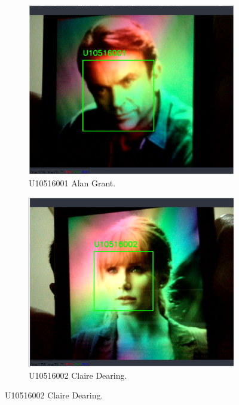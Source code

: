 \documentclass[14pt]{report}
\begin{document}
\begin{figure}[h!]
    \centering
        \begin{subfigure}[b]{0.32\linewidth}
            \includegraphics[width=\linewidth]{exp01.eps}
            \caption{U10516001 Alan Grant.}
        \end{subfigure}
        \begin{subfigure}[b]{0.32\linewidth}
            \includegraphics[width=\linewidth]{exp02.eps}
            \caption{U10516002 Claire Dearing.}
        \end{subfigure}

\end{figure}
\end{document}
